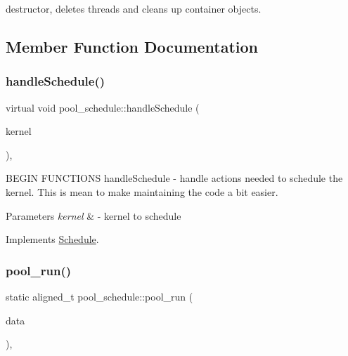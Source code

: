 destructor, deletes threads and cleans up container objects. 

\subsection{Member Function Documentation}
\hypertarget{classpool__schedule_afc614a83c6cddc28dc6fae01f6333b90}{}\label{classpool__schedule_afc614a83c6cddc28dc6fae01f6333b90} 
\subsubsection{\texorpdfstring{handle\+Schedule()}{handleSchedule()}}
{\footnotesize\ttfamily virtual void pool\+\_\+schedule\+::handle\+Schedule (\begin{DoxyParamCaption}\item[{\hyperlink{classraft_1_1kernel}{raft\+::kernel} $\ast$const}]{kernel }\end{DoxyParamCaption})\hspace{0.3cm}{\ttfamily [protected]}, {\ttfamily [virtual]}}

B\+E\+G\+IN F\+U\+N\+C\+T\+I\+O\+NS handle\+Schedule -\/ handle actions needed to schedule the kernel. This is mean to make maintaining the code a bit easier. 
\begin{DoxyParams}{Parameters}
{\em kernel} & -\/ kernel to schedule \\
\hline
\end{DoxyParams}


Implements \hyperlink{class_schedule}{Schedule}.

\hypertarget{classpool__schedule_a41aa8262dfd682963f25fbfb27d0cf35}{}\label{classpool__schedule_a41aa8262dfd682963f25fbfb27d0cf35} 
\subsubsection{\texorpdfstring{pool\+\_\+run()}{pool\_run()}}
{\footnotesize\ttfamily static aligned\+\_\+t pool\+\_\+schedule\+::pool\+\_\+run (\begin{DoxyParamCaption}\item[{void $\ast$}]{data }\end{DoxyParamCaption})\hspace{0.3cm}{\ttfamily [static]}, {\ttfamily [protected]}}

